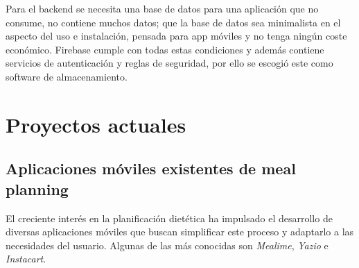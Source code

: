 \documentclass[twoside, openright, 11pt]{report}
\begin{document}
		Para el backend se necesita una base de datos para una aplicación que no consume, no contiene muchos datos; que la base de datos sea minimalista en el aspecto del uso e instalación, pensada para app móviles y no tenga ningún coste económico. Firebase cumple con todas estas condiciones y además contiene servicios de autenticación y reglas de seguridad, por ello se escogió este como software de almacenamiento.
		
		
  	
  \section{Proyectos actuales}
  \subsection*{Aplicaciones móviles existentes de meal planning}
  El creciente interés en la planificación dietética ha impulsado el desarrollo de diversas aplicaciones móviles que buscan simplificar este proceso y adaptarlo a las necesidades del usuario. Algunas de las más conocidas son \textit{Mealime}, \textit{Yazio} e \textit{Instacart}.\\
  
\end{document}
